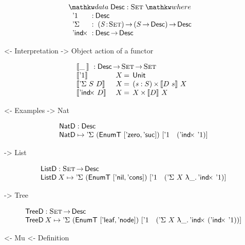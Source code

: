 \documentclass[preprint, authoryear]{sigplanconf}
\newenvironment{structure}{\footnotesize\verbatim}{\endverbatim}
\begin{document}
\[
\stk{
\data \Desc : \Set \where \\
\;\;\begin{array}{@{}l@{\::\:}l@{\quad}l}
    \DUnit          & \Desc \\
    \DSigma         & \PI{\V{S}}{\Set} \PIS{S \To \Desc} \Desc \\
    \DIndx          & \Desc \To \Desc
\end{array}
}
\]

\begin{structure}
<- Interpretation
    -> Object action of a functor
\end{structure}


\[\stk{
\descop{\_\:}{} : \Desc \To \Set \To \Set \\
\begin{array}{@{}ll@{\:=\:\:}ll}
\descop{\DUnit}{& X}        &  \Unit                                       \\
\descop{\DSigma{S}{D}}{& X} &  \SIGMAS{\V{s} : S}{\descop{D~s}{X}}         \\
\descop{\DIndx{D}}{& X}     &  \TIMES{X}{\descop{D}{X}}
\end{array}
}\]

\begin{structure}
<- Examples
    -> Nat
\end{structure}

\[\stk{
\NatD : \Desc \\
\NatD \mapsto \DSigma{(\EnumT [ \NatZero, \NatSuc ])}
                     {[ \DUnit \quad (\DIndx{\DUnit}) ]}
}\]

\begin{structure}
    -> List
\end{structure}

\[\stk{
\ListD : \Set \To \Desc \\
\ListD \: X \mapsto \DSigma{(\EnumT [ \ListNil, \ListCons ])}
                           {[ \DUnit \quad (\DSigma{X}{\LAM{\_} \DIndx{\DUnit}}) ]}
}\]

\begin{structure}
    -> Tree
\end{structure}

\[\stk{
\TreeD : \Set \To \Desc \\
\TreeD \: X \mapsto \DSigma{(\EnumT [ \TreeLeaf, \TreeNode ])}
                           {[ \DUnit \quad (\DSigma{X}{\LAM{\_} \DIndx{(\DIndx{\DUnit})}}) ]}
}\]

\begin{structure}
<- Mu
    <- Definition
\end{structure}
\end{document}
